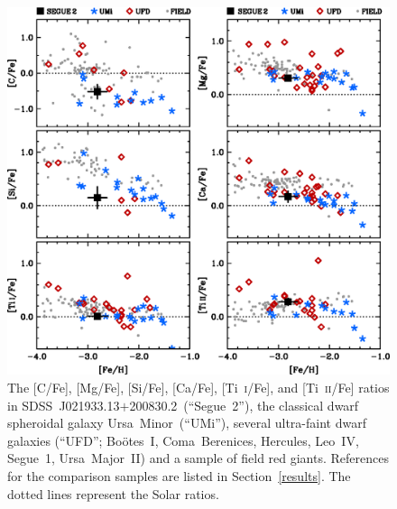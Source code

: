 \documentclass[useAMS,usenatbib,usegraphicx]{mn2e}
\def\segalt{\mbox{SDSS~J021933.13$+$200830.2}}
\def\umigal{\mbox{Ursa Minor}}
\def\boogal{\mbox{Bo\"{o}tes~I}}
\def\comgal{\mbox{Coma Berenices}}
\def\hergal{\mbox{Hercules}}
\def\leogal{\mbox{Leo~IV}}
\def\segigal{\mbox{Segue~1}}
\def\umagal{\mbox{Ursa Major~II}}
\begin{document}
\begin{figure}
\centering
\includegraphics[angle=00,width=5.0in]{fig3.eps}
\caption{
\label{abundplot1}
The [C/Fe], [Mg/Fe], [Si/Fe], [Ca/Fe], [Ti~\textsc{i}/Fe], and 
[Ti~\textsc{ii}/Fe] ratios in 
\segalt\ (``Segue~2''),
the classical dwarf spheroidal galaxy \umigal\ (``UMi''),
several ultra-faint dwarf galaxies (``UFD'';
\boogal, \comgal, \hergal, \leogal, \segigal, \umagal)
and a sample of field red giants.
References for the comparison samples are listed in Section~\ref{results}.
The dotted lines represent the Solar ratios.
}
\end{figure}
\end{document}
